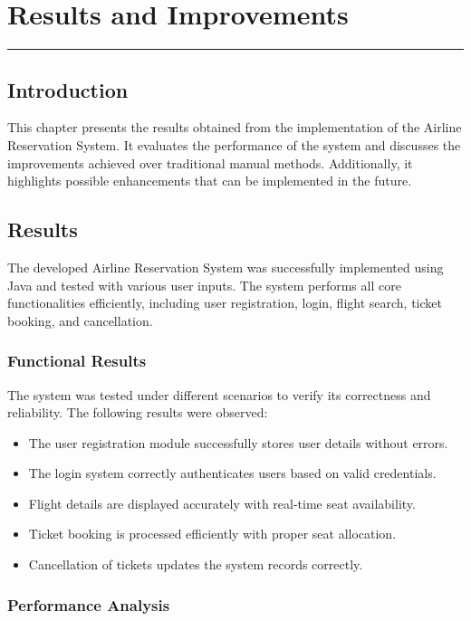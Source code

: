\chapter{Results and Improvements}
\noindent\rule{\linewidth}{2pt}
\section{Introduction}

This chapter presents the results obtained from the implementation of the Airline Reservation System. It evaluates the performance of the system and discusses the improvements achieved over traditional manual methods. Additionally, it highlights possible enhancements that can be implemented in the future.

\section{Results}

The developed Airline Reservation System was successfully implemented using Java and tested with various user inputs. The system performs all core functionalities efficiently, including user registration, login, flight search, ticket booking, and cancellation.

\subsection{Functional Results}

The system was tested under different scenarios to verify its correctness and reliability. The following results were observed:

\begin{itemize}
\item The user registration module successfully stores user details without errors.
\item The login system correctly authenticates users based on valid credentials.
\item Flight details are displayed accurately with real-time seat availability.
\item Ticket booking is processed efficiently with proper seat allocation.
\item Cancellation of tickets updates the system records correctly.
\end{itemize}

\subsection{Performance Analysis}

